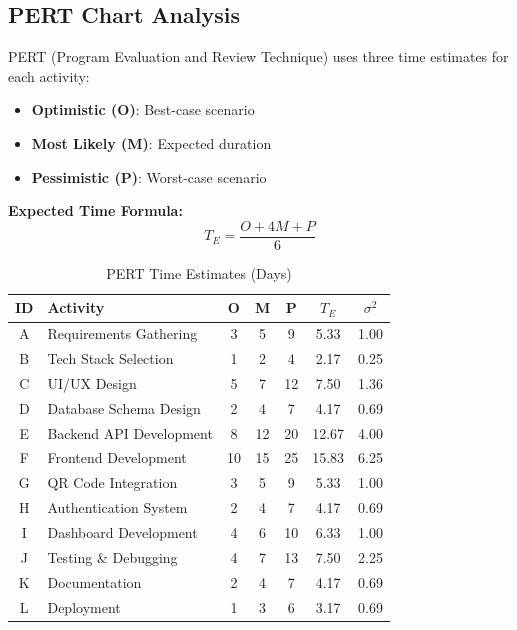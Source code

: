 \documentclass[12pt,a4paper]{article}
\begin{document}
\subsection{PERT Chart Analysis}

PERT (Program Evaluation and Review Technique) uses three time estimates for each activity:
\begin{itemize}
    \item \textbf{Optimistic (O)}: Best-case scenario
    \item \textbf{Most Likely (M)}: Expected duration
    \item \textbf{Pessimistic (P)}: Worst-case scenario
\end{itemize}

\textbf{Expected Time Formula:}
\begin{equation}
T_E = \frac{O + 4M + P}{6}
\end{equation}

\begin{table}[H]
\centering
\small
\begin{tabular}{|c|p{4cm}|c|c|c|c|c|}
\hline
\textbf{ID} & \textbf{Activity} & \textbf{O} & \textbf{M} & \textbf{P} & \textbf{$T_E$} & \textbf{$\sigma^2$} \\
\hline
A & Requirements Gathering & 3 & 5 & 9 & 5.33 & 1.00 \\
\hline
B & Tech Stack Selection & 1 & 2 & 4 & 2.17 & 0.25 \\
\hline
C & UI/UX Design & 5 & 7 & 12 & 7.50 & 1.36 \\
\hline
D & Database Schema Design & 2 & 4 & 7 & 4.17 & 0.69 \\
\hline
E & Backend API Development & 8 & 12 & 20 & 12.67 & 4.00 \\
\hline
F & Frontend Development & 10 & 15 & 25 & 15.83 & 6.25 \\
\hline
G & QR Code Integration & 3 & 5 & 9 & 5.33 & 1.00 \\
\hline
H & Authentication System & 2 & 4 & 7 & 4.17 & 0.69 \\
\hline
I & Dashboard Development & 4 & 6 & 10 & 6.33 & 1.00 \\
\hline
J & Testing \& Debugging & 4 & 7 & 13 & 7.50 & 2.25 \\
\hline
K & Documentation & 2 & 4 & 7 & 4.17 & 0.69 \\
\hline
L & Deployment & 1 & 3 & 6 & 3.17 & 0.69 \\
\hline
\end{tabular}
\caption{PERT Time Estimates (Days)}
\end{table}
\end{document}
